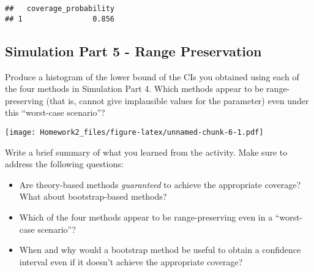 \documentclass[
]{article}
\newenvironment{Shaded}{\begin{snugshade}}{\end{snugshade}}
\newcommand{\AttributeTok}[1]{\textcolor[rgb]{0.77,0.63,0.00}{#1}}
\newcommand{\DecValTok}[1]{\textcolor[rgb]{0.00,0.00,0.81}{#1}}
\newcommand{\FunctionTok}[1]{\textcolor[rgb]{0.00,0.00,0.00}{#1}}
\newcommand{\NormalTok}[1]{#1}
\newcommand{\SpecialCharTok}[1]{\textcolor[rgb]{0.00,0.00,0.00}{#1}}
\providecommand{\tightlist}{%
  \setlength{\itemsep}{0pt}\setlength{\parskip}{0pt}}
\begin{document}
\begin{verbatim}
##   coverage_probability
## 1                0.856
\end{verbatim}

\hypertarget{simulation-part-5---range-preservation}{%
\subsection{Simulation Part 5 - Range
Preservation}\label{simulation-part-5---range-preservation}}

Produce a histogram of the lower bound of the CIs you obtained using
each of the four methods in Simulation Part 4. Which methods appear to
be range-preserving (that is, cannot give implausible values for the
parameter) even under this ``worst-case scenario''?

\begin{Shaded}
\end{Shaded}

\texttt{[image: Homework2\_files/figure-latex/unnamed-chunk-6-1.pdf]}

Write a brief summary of what you learned from the activity. Make sure
to address the following questions:

\begin{itemize}
\tightlist
\item
  Are theory-based methods \emph{guaranteed} to achieve the appropriate
  coverage? What about bootstrap-based methods?
\item
  Which of the four methods appear to be range-preserving even in a
  ``worst-case scenario''?
\item
  When and why would a bootstrap method be useful to obtain a confidence
  interval even if it doesn't achieve the appropriate coverage?
\end{itemize}
\end{document}
